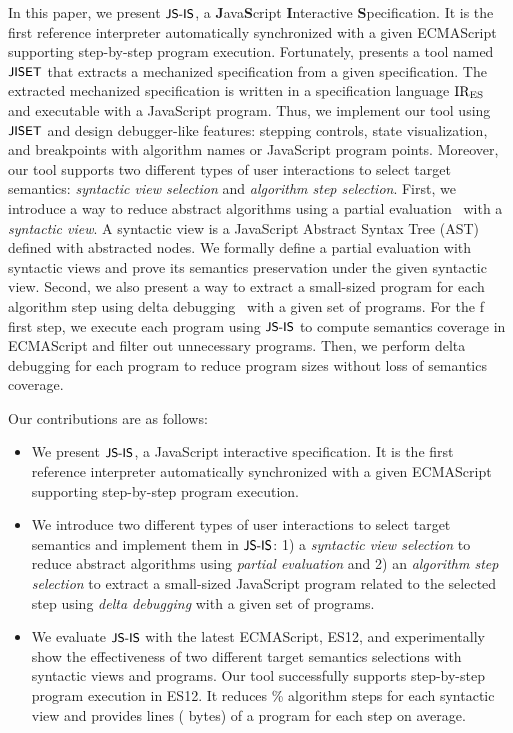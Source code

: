 In this paper, we present $\textsf{\small JS-IS}$, a \textbf{J}ava\textbf{S}cript
\textbf{I}nteractive \textbf{S}pecification. It is the first reference
interpreter automatically synchronized with a given ECMAScript supporting
step-by-step program execution. Fortunately, \citet{jiset} presents a tool named
$\textsf{\small JISET}$ that extracts a mechanized specification from a given specification.
The extracted mechanized specification is written in a specification language
$\text{IR}_\text{ES}$ and executable with a JavaScript program. Thus, we implement our tool
using $\textsf{\small JISET}$ and design debugger-like features: stepping controls, state
visualization, and breakpoints with algorithm names or JavaScript program
points. Moreover, our tool supports two different types of user interactions to
select target semantics: \textit{syntactic view selection} and \textit{algorithm
step selection}. First, we introduce a way to reduce abstract algorithms using a
partial evaluation~\cite{peval, peval-survey, trans-ai} with a \textit{syntactic
view}. A syntactic view is a JavaScript Abstract Syntax Tree (AST) defined with
abstracted nodes. We formally define a partial evaluation with syntactic views
and prove its semantics preservation under the given syntactic view. Second, we
also present a way to extract a small-sized program for each algorithm step
using delta debugging~\cite{delta-debugging} with a given set of programs. For
the f first step, we execute each program using $\textsf{\small JS-IS}$ to compute semantics
coverage in ECMAScript and filter out unnecessary programs. Then, we perform
delta debugging for each program to reduce program sizes without loss of
semantics coverage.

Our contributions are as follows:
\begin{itemize}
  \item We present $\textsf{\small JS-IS}$, a JavaScript interactive specification. It is the
    first reference interpreter automatically synchronized with a given
    ECMAScript supporting step-by-step program execution.

  \item We introduce two different types of user interactions to select target
    semantics and implement them in $\textsf{\small JS-IS}$: 1) a \textit{syntactic view
    selection} to reduce abstract algorithms using \textit{partial evaluation}
    and 2) an \textit{algorithm step selection} to extract a small-sized
    JavaScript program related to the selected step using \textit{delta
    debugging} with a given set of programs.

  \item We evaluate $\textsf{\small JS-IS}$ with the latest ECMAScript, ES12, and experimentally
    show the effectiveness of two different target semantics selections with
     syntactic views and  programs. Our tool
    successfully supports step-by-step program execution in ES12. It reduces
    \% algorithm steps for each syntactic view and provides
     lines ( bytes) of a program for each step on
    average.
\end{itemize}
